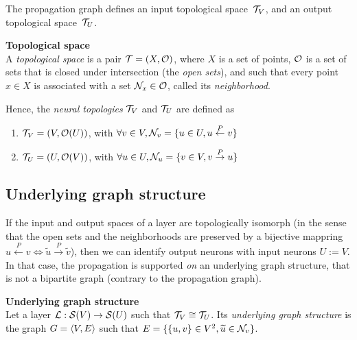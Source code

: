 The propagation graph defines an input topological space~$\mathcal{T}_V$, and an output topological space~$\mathcal{T}_U$.

\begin{definition}\textbf{Topological space}\\
A \emph{topological space} is a pair $\mathcal{T} = (X, \mathcal{O})$, where $X$ is a set of points, $\mathcal{O}$ is a set of sets that is closed under intersection (the \emph{open sets}), and such that every point $x \in X$ is associated with a set $\mathcal{N}_x \in \mathcal{O}$, called its \emph{neighborhood}.
\end{definition}

Hence, the \emph{neural topologies} $\mathcal{T}_V$ and $\mathcal{T}_U$ are defined as
\begin{enumerate}
\item $\mathcal{T}_V = (V, \mathcal{O}(U))$, with $\forall v \in V, \mathcal{N}_v = \{u \in U, u \overset{P}\leftarrow v \}$
\item $\mathcal{T}_U = (U, \mathcal{O}(V))$, with $\forall u \in U, \mathcal{N}_u = \{v \in V, v \overset{P}\rightarrow u \}$
\end{enumerate}

\subsection{Underlying graph structure}

If the input and output spaces of a layer are topologically isomorph (in the sense that the open sets and the neighborhoods are preserved by a bijective mappring \ie $u \overset{P}\leftarrow v \Leftrightarrow \widetilde{u} \overset{P}\rightarrow \widetilde{v}$), then we can identify output neurons with input neurons $U:=V$. In that case, the propagation is supported \emph{on} an underlying graph structure, that is not a bipartite graph (contrary to the propagation graph).

\begin{definition}\textbf{Underlying graph structure}\\
Let a layer $\mathcal{L}: \mathcal{S}(V) \rightarrow \mathcal{S}(U)$ such that $\mathcal{T}_V \cong \mathcal{T}_U$. Its \emph{underlying graph structure} is the graph $G = \langle V, E \rangle$ such that $E = \{ \{u,v\} \in V^2, \widetilde{u} \in \mathcal{N}_v \}$.
\end{definition}



\todo{}










